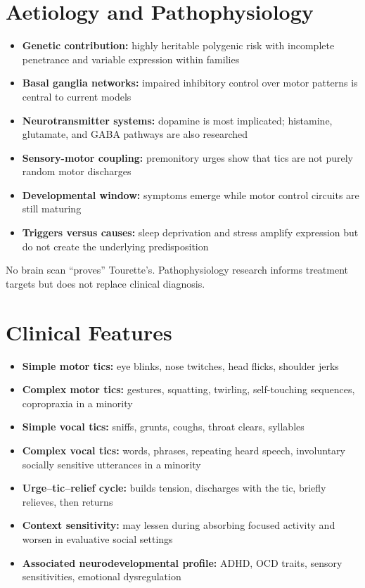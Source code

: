 \section*{Aetiology and Pathophysiology}
\begin{itemize}
    \item \textbf{Genetic contribution:} highly heritable polygenic risk with incomplete penetrance and variable expression within families
    \item \textbf{Basal ganglia networks:} impaired inhibitory control over motor patterns is central to current models
    \item \textbf{Neurotransmitter systems:} dopamine is most implicated; histamine, glutamate, and GABA pathways are also researched
    \item \textbf{Sensory-motor coupling:} premonitory urges show that tics are not purely random motor discharges
    \item \textbf{Developmental window:} symptoms emerge while motor control circuits are still maturing
    \item \textbf{Triggers versus causes:} sleep deprivation and stress amplify expression but do not create the underlying predisposition
\end{itemize}
No brain scan ``proves'' Tourette's. Pathophysiology research informs treatment targets but does not replace clinical diagnosis.

\section*{Clinical Features}
\begin{itemize}
    \item \textbf{Simple motor tics:} eye blinks, nose twitches, head flicks, shoulder jerks
    \item \textbf{Complex motor tics:} gestures, squatting, twirling, self-touching sequences, copropraxia in a minority
    \item \textbf{Simple vocal tics:} sniffs, grunts, coughs, throat clears, syllables
    \item \textbf{Complex vocal tics:} words, phrases, repeating heard speech, involuntary socially sensitive utterances in a minority
    \item \textbf{Urge--tic--relief cycle:} builds tension, discharges with the tic, briefly relieves, then returns
    \item \textbf{Context sensitivity:} may lessen during absorbing focused activity and worsen in evaluative social settings
    \item \textbf{Associated neurodevelopmental profile:} ADHD, OCD traits, sensory sensitivities, emotional dysregulation
\end{itemize}

